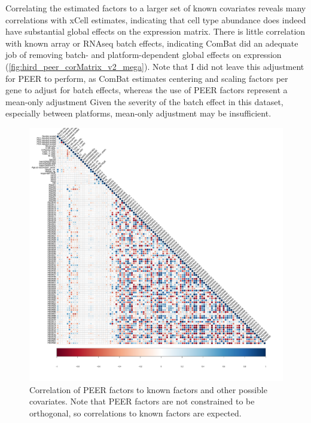 Correlating the estimated factors to a larger set of known covariates reveals many correlations with xCell estimates, indicating that cell type abundance does indeed have substantial global effects on the expression matrix.
There is little correlation with known array or \gls{RNAseq} batch effects, indicating ComBat did an adequate job of removing batch- and platform-dependent global effects on expression (\autoref{fig:hird_peer_corMatrix_v2_mega}).
Note that I did not leave this adjustment for PEER to perform, as ComBat estimates centering and scaling factors per gene to adjust for batch effects, whereas the use of PEER factors represent a mean-only adjustment
Given the severity of the batch effect in this dataset, especially between platforms, mean-only adjustment may be insufficient\autocite{zhang2018AlternativeEmpiricalBayes}.

\begin{figure}
    \centering
    \includegraphics[width=1.0\textwidth,page=1]{mainmatter/figures/chapter_03/peer_mega/peer.factor_cor_matrix.v2.pdf}
    \caption{Correlation of PEER factors to known factors and other possible covariates. Note that PEER factors are not constrained to be orthogonal, so correlations to known factors are expected.}
    \label{fig:hird_peer_corMatrix_v2_mega}
\end{figure}

